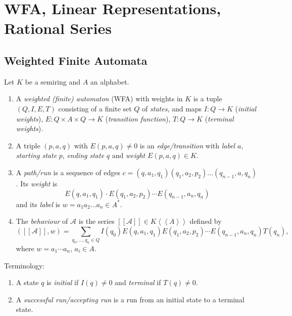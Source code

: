 \section{WFA, Linear Representations, Rational Series}

\subsection{Weighted Finite Automata}

\begin{definition}
    Let $K$ be a semiring and $A$ an alphabet.
    \begin{enumerate}[(1)]
        \item A \emph{weighted (finite) automaton} (WFA) with weights in $K$ 
        is a tuple $(Q, I, E, T)$ consisting of a finite set $Q$ of \emph{states},
        and maps $I \colon Q \rightarrow K$ (\emph{initial weights}), 
        $E \colon Q \times A \times Q \rightarrow K$ (\emph{transition function}),
        $T \colon Q \to K$ (\emph{terminal weights}).
        \item A triple $(p, a, q)$ with $E(p, a, q) \neq 0$ is an 
        \emph{edge/transition} with \emph{label} $a$, \emph{starting state} 
        $p$, \emph{ending state} $q$ and \emph{weight} $E(p, a, q) \in K$.
        \item A \emph{path/run} is a sequence of edges
        $c=(q,a_1, q_1)(q_1, a_2, p_2) \dots (q_{n-1}, a, q_n)$. Its 
        \emph{weight} is 
        \[
            E(q,a_1, q_1)\cdot E(q_1, a_2, p_2) \cdots E(q_{n-1}, a_n, q_n)
        \]
        and its \emph{label} is $w = a_1a_2\dots a_n \in A^*$.
        \item The \emph{behaviour} of $\mathcal{A}$ is the series $[[\mathcal{A}]]
        \in K \left<\left<A\right>\right>$ defined by 
        \[
            ([[\mathcal{A}]], w) = \sum_{q_0, \dots, q_n \in Q} I(q_0)
            E(q,a_1, q_1)E(q_1, a_2, p_2) \cdots E(q_{n-1}, a_n, q_n)T(q_n),
        \]
        where $w = a_1\cdots a_n$, $a_i \in A$.
    \end{enumerate}
\end{definition}

\begin{definition} Terminology:
    \begin{enumerate}
        \item A state $q$ is \emph{initial} if $I(q) \neq 0$ and 
        \emph{terminal} if $T(q) \neq 0$.
        \item A \emph{successful run/accepting run} is a run from 
        an initial state to a terminal state. 
    \end{enumerate}
\end{definition}

